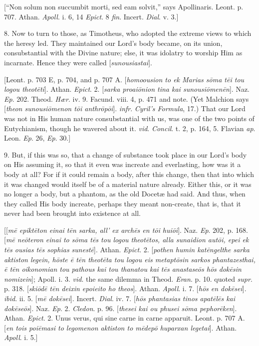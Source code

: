 [``Non solum non succumbit morti, sed eam solvit,'' says
Apollinaris. Leont. p. 707. Athan. \emph{Apoll}. i. 6, 14 \emph{Epict}.
8 \emph{fin}. Incert. \emph{Dial}. v. 3.]

8. Now to turn to those, as Timotheus, who adopted the extreme
views to which the heresy led. They maintained our Lord's body became,
on its union, consubstantial with the Divine nature; else, it was
idolatry to worship Him as incarnate. Hence they were called [\emph{sunousiastai}].

[Leont. p. 703 E, p. 704, and p. 707 A. [\emph{homoousion to ek Marias
s\={o}ma t\={e}i tou logou theot\={e}ti}]. Athan. \emph{Epict}.
2. [\emph{sarka proai\={o}nion tina kai sunousi\={o}men\={e}n}].
Naz. \emph{Ep}. 202. Theod. \emph{Hær}. iv. 9. Facund. viii. 4, p.
471 and note. (Yet Malchion says [\emph{theon sunousi\={o}menon t\={o}i
anthr\={o}p\={o}i}]. \emph{infr}. \emph{Cyril's Formula}, 17.) That our
Lord was not in His human nature
consubstantial with us, was one of the two points of Eutychianism,
though he wavered about it. \emph{vid}. \emph{Concil}. t. 2, p. 164,
5. Flavian \emph{ap}. Leon. \emph{Ep}. 26, \emph{Ep}. 30.]

9. But, if this was so, that a change of substance took place in
our Lord's body on His assuming it, so that it even was increate and
everlasting, how was it a body at all? For if it could remain a body,
after this change, then that into which it was changed would itself be
of a material nature already. Either this, or it was no longer a body,
but a phantom, as the old Docetæ had said. And thus, when they called
His body increate, perhaps they meant non-create, that is, that it
never had been brought into existence at all.

[[\emph{m\={e} epikt\={e}ton einai t\={e}n sarka, all' ex
arch\={e}s en t\={o}i hui\={o}i}]. Naz. \emph{Ep}. 202, p.
168. [\emph{m\={e} ne\={o}teron einai to s\={o}ma t\={e}s tou
logou theot\={e}tos, alla sunaidion aut\={o}i, epei ek t\={e}s
ousias t\={e}s sophias sunest\={e}}]. Athan. \emph{Epict}. 2.
[\emph{pothen humin kat\={e}ngelthe sarka aktiston legein, h\={o}ste
\={e} t\={e}n theot\={e}ta tou logou eis metapt\={o}sin
sarkos phantazesthai, \={e} t\={e}n oikonomian tou pathous kai
tou thanatou kai t\={e}s anastase\={o}s h\={o}s dok\={e}sin
nomizein}]; Apoll. i. 3. \emph{vid}. the same dilemma in Theod. \emph{Eran}.
p. 10. quoted \emph{supr}. p. 318. [\emph{ski\={o}d\={e} t\={e}n
deixin epoieito ho theos}]. Athan. \emph{Apoll}. i. 7. [\emph{h\={o}s
en dok\={e}sei}]. \emph{ibid}. ii. 5. [\emph{m\={e} dok\={e}sei}].
Incert. \emph{Dial}. iv. 7. [\emph{h\={o}s phantasias tinos apat\={e}l\={e}s
kai dok\={e}se\={o}s}]. Naz. \emph{Ep}. 2. \emph{Cledon}. p.
96. [\emph{thesei kai ou phusei s\={o}ma pephor\={e}ken}]. Athan.
\emph{Epict}. 2. Unus verus, qui sine carne in carne apparuit. Leont.
p. 707 A. [\emph{en tois poi\={e}masi to legomenon aktiston to m\={e}dep\={o}
huparxan legetai}]. Athan. \emph{Apoll}. i. 5.]


